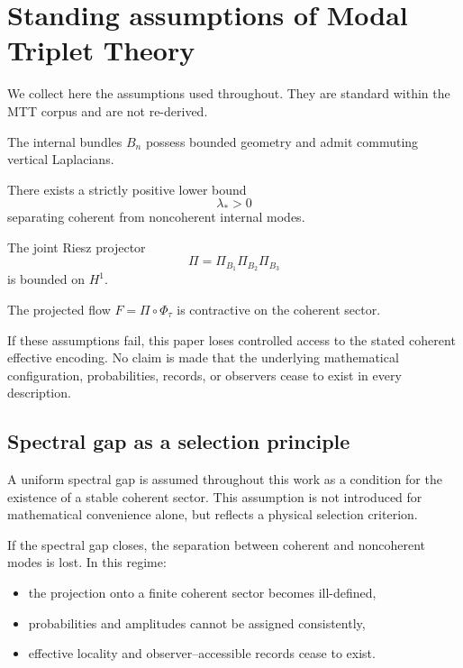 \documentclass[11pt]{article}
\begin{document}
\section{Standing assumptions of Modal Triplet Theory}

We collect here the assumptions used throughout.
They are standard within the MTT corpus and are not re-derived.

\begin{assumption}
The internal bundles $B_n$ possess bounded geometry and admit commuting vertical Laplacians.
\end{assumption}

\begin{assumption}
There exists a strictly positive lower bound
\[
\lambda_{\ast} > 0
\]
separating coherent from noncoherent internal modes.
\end{assumption}

\begin{assumption}
The joint Riesz projector
\[
\Pi = \Pi_{B_1}\Pi_{B_2}\Pi_{B_3}
\]
is bounded on $H^1$.
\end{assumption}

\begin{assumption}
The projected flow $F=\Pi\circ\Phi_\tau$ is contractive on the coherent sector.
\end{assumption}

\begin{remark}
If these assumptions fail, this paper loses controlled access to the stated
coherent effective encoding.  No claim is made that the underlying
mathematical configuration, probabilities, records, or observers cease to
exist in every description.
\end{remark}

\subsection{Spectral gap as a selection principle}

A uniform spectral gap is assumed throughout this work as a condition for the
existence of a stable coherent sector.
This assumption is not introduced for mathematical convenience alone, but
reflects a physical selection criterion.

If the spectral gap closes, the separation between coherent and noncoherent
modes is lost.
In this regime:
\begin{itemize}
\item the projection onto a finite coherent sector becomes ill-defined,
\item probabilities and amplitudes cannot be assigned consistently,
\item effective locality and observer--accessible records cease to exist.
\end{itemize}
\end{document}

